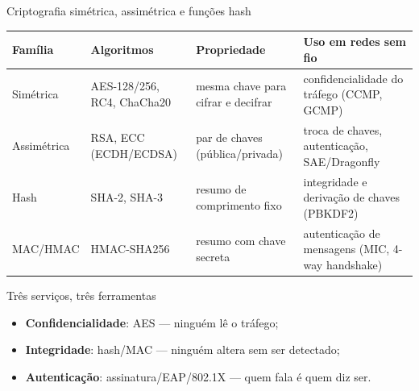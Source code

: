 \documentclass[aspectratio=169,11pt]{beamer}
\begin{document}
\begin{frame}{Criptografia simétrica, assimétrica e funções hash}
  \begin{center}
    \scriptsize
    \begin{tabularx}{\textwidth}{@{}lXXX@{}}
      \toprule
      \textbf{Família} & \textbf{Algoritmos} & \textbf{Propriedade} & \textbf{Uso em redes sem fio}\\
      \midrule
      Simétrica & AES-128/256, RC4, ChaCha20 & mesma chave para cifrar e decifrar & confidencialidade do tráfego (CCMP, GCMP)\\
      Assimétrica & RSA, ECC (ECDH/ECDSA) & par de chaves (pública/privada) & troca de chaves, autenticação, SAE/Dragonfly\\
      Hash & SHA-2, SHA-3 & resumo de comprimento fixo & integridade e derivação de chaves (PBKDF2)\\
      MAC/HMAC & HMAC-SHA256 & resumo com chave secreta & autenticação de mensagens (MIC, 4-way handshake)\\
      \bottomrule
    \end{tabularx}
  \end{center}
  \pause
  \begin{block}{Três serviços, três ferramentas}
    \begin{itemize}
      \item \textbf{Confidencialidade}: AES --- ninguém lê o tráfego;
      \item \textbf{Integridade}: hash/MAC --- ninguém altera sem ser detectado;
      \item \textbf{Autenticação}: assinatura/EAP/802.1X --- quem fala é quem diz ser.
    \end{itemize}
  \end{block}
\end{frame}
\end{document}
